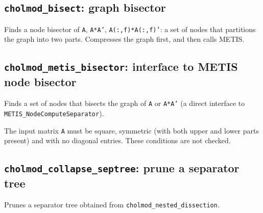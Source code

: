 \documentclass[11pt]{article}
\begin{document}
\newpage
\subsection{{\tt cholmod\_bisect}: graph bisector}


Finds a node bisector of {\tt A}, {\tt A*A'}, {\tt A(:,f)*A(:,f)'}:
a set of nodes that partitions the graph into two parts.
Compresses the graph first, and then calls METIS.

\subsection{{\tt cholmod\_metis\_bisector}: interface to METIS node bisector}


Finds a set of nodes that bisects the graph of {\tt A} or {\tt A*A'} (a direct interface to \newline
{\tt METIS\_NodeComputeSeparator}).

The input matrix {\tt A} must be square, symmetric (with both upper and lower
parts present) and with no diagonal entries.  These conditions are not
checked.

\newpage
\subsection{{\tt cholmod\_collapse\_septree}: prune a separator tree}


Prunes a separator tree obtained from {\tt cholmod\_nested\_dissection}.

\newpage


\end{document}
